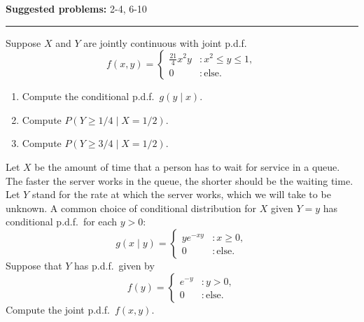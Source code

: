 \documentclass[12pt,reqno]{amsart}
\begin{document}
\textbf{Suggested problems:} 2-4, 6-10

\bigskip
\hrule

\bigskip
\prob Suppose $X$ and $Y$ are jointly continuous with joint p.d.f.
\[
	f(x,y) = \begin{cases}
	\frac{21}{4}x^2y & : x^2 \leq y \leq 1, \\
	0 & : \text{else}.
	\end{cases}
\]

\begin{enumerate}
\item Compute the conditional p.d.f.\ $g(y\mid x)$.\vfill
\item Compute $P(Y\geq 1/4 \mid X=1/2)$.\vfill
\item Compute $P(Y\geq 3/4 \mid X=1/2)$.
\end{enumerate}

\vfill
\newpage
\prob Let $X$ be the amount of time that a person has to wait for service in a queue. The faster the server works in the queue, the shorter should be the waiting time. Let $Y$ stand for the rate at which the server works, which we will take to be unknown. A common choice of conditional distribution for $X$ given $Y=y$ has conditional p.d.f.\ for each $y>0$:
\[
	g(x\mid y) = \begin{cases}
	y e^{-xy} & : x\geq 0, \\
	0 & : \text{else}.
	\end{cases}
\]
Suppose that $Y$ has p.d.f.\ given by
\[
	f(y) = \begin{cases}
	e^{-y} & : y>0, \\
	0 & : \text{else}.
	\end{cases}
\]
Compute the joint p.d.f.\ $f(x,y)$.
\end{document}
